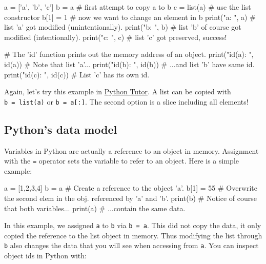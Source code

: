 \documentclass[12pt]{article} \newif\ifsolution\solutiontrue %
\begin{document}
\begin{python}
a = ['a', 'b', 'c']
b = a       # first attempt to copy a to b
c = list(a) # use the list constructor
b[1] = 1    # now we want to change an element in b
print("a: ", a)  # list 'a' got modified (unintentionally).
print("b: ", b)  # list 'b' of course got modified (intentionally).
print("c: ", c)  # list 'c' got preserved, success!

# The 'id' function prints out the memory address of an object.
print("id(a): ", id(a))  # Note that list 'a'...
print("id(b): ", id(b))  # ...and list 'b' have same id.
print("id(c): ", id(c))  # List 'c' has its own id.
\end{python}

Again, let's try this example in
\href{http://pythontutor.com/iframe-embed.html\#code=a+\%3D+\%5B'a',+'b',+'c'\%5D\%0Ab+\%3D+a+++++++\%23+first+attempt+to+copy+a+to+b\%0Ac+\%3D+list(a\%29+\%23+use+the+list+constructor\%0Ab\%5B1\%5D+\%3D+1++++\%23+now+we+want+to+change+an+element+in+b\&origin=opt-frontend.js\&cumulative=false\&heapPrimitives=false\&textReferences=false\&py=3\&rawInputLstJSON=\%5B\%5D\&curInstr=0\&codeDivWidth=350\&codeDivHeight=400}{Python
Tutor}.
A list can be copied with \texttt{b\ =\ list(a)} or
\texttt{b\ =\ a{[}:{]}}. The second option is a slice including all
elements!

\vspace{-10pt}
\subsection{Python's data model}\label{pythons-data-model}

Variables in Python are actually a reference to an object in memory.
Assignment with the \texttt{=} operator sets the variable to refer to an
object. Here is a simple example:

\begin{python}
a = [1,2,3,4]
b = a          # Create a reference to the object 'a'.
b[1] = 55      # Overwrite the second elem in the obj. referenced by 'a' and 'b'.
print(b)       # Notice of course that both variables...
print(a)       # ...contain the same data.
\end{python}

In this example, we assigned \texttt{a} to \texttt{b} via
\texttt{b\ =\ a}. This did not copy the data, it only copied the
reference to the list object in memory. Thus modifying the list through
\texttt{b} also changes the data that you will see when accessing from
\texttt{a}. You can inspect object ids in Python with:
\end{document}
